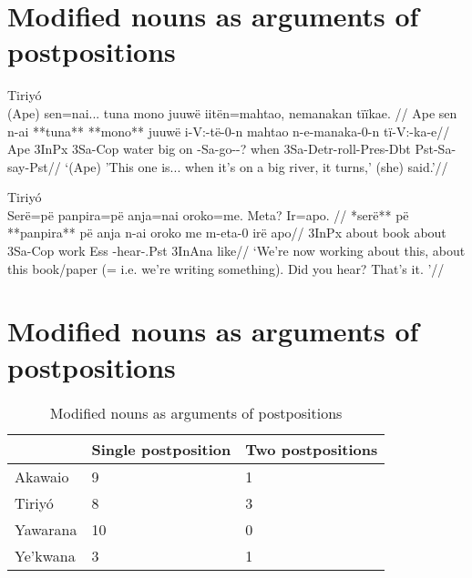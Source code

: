 \documentclass[10pt]{article}
\begin{document}

\section{Modified nouns as arguments of postpositions}

\ex Tiriyó \parencite{meiraDBtrio} \\
\label{dados-09-kereramake-p-041-270}    \begingl
    \glpreamble (Ape) sen=nai... tuna mono juuwë iitën=mahtao, nemanakan tïïkae. //
    \gla Ape sen n-ai **tuna** **mono** juuwë i-V:-të-0-n mahtao n-e-manaka-0-n tï-V:-ka-e//
    \glb Ape 3InPx 3Sa-Cop water big on -Sa-go--? when 3Sa-Detr-roll-Pres-Dbt Pst-Sa-say-Pst//
        \glft ‘(Ape) 'This one is... when it's on a big river, it turns,' (she) said.’//  
    \endgl 
\xe

\ex Tiriyó \parencite{meiraDBtrio} \\
\label{mini-disc-lsmtam13set0001-marciano-little-introduction-005}    \begingl
    \glpreamble Serë=pë panpira=pë anja=nai oroko=me. Meta? Ir=apo. //
    \gla **serë** pë **panpira** pë anja n-ai oroko me m-eta-0 irë apo//
    \glb 3InPx about book about  3Sa-Cop work Ess -hear-.Pst 3InAna like//
        \glft ‘We're now working about this, about this book/paper (= i.e. we're writing something). Did you hear? That's it.  ’//  
    \endgl 
\xe

\section{Modified nouns as arguments of postpositions}

\begin{table}
\caption{Modified nouns as arguments of postpositions}
\label{tab:postparg}
\centering
\begin{tabular}{lll}
\toprule
         & Single postposition & Two postpositions \\
\midrule
 Akawaio &                   9 &                 1 \\
  Tiriyó &                   8 &                 3 \\
Yawarana &                  10 &                 0 \\
Ye'kwana &                   3 &                 1 \\
\bottomrule
\end{tabular}

\end{table}
\end{document}
